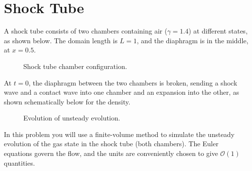 \pagebreak
\section{Shock Tube}
A shock tube consists of two chambers containing air ($\gamma = 1.4$) at different states, as shown below. The domain length is $L= 1$, and the diaphragm is in the middle, at $x= 0.5$.

\begin{figure}[h]
    \centering
    
    \caption{Shock tube chamber configuration.}
\end{figure}

At $t= 0$, the diaphragm between the two chambers is broken, sending a shock wave and a contact wave into one chamber and an expansion into the other, as shown schematically below for the density.

\begin{figure}[h]
    \centering
    
    \caption{Evolution of unsteady evolution.}
\end{figure}

In this problem you will use a finite-volume method to simulate the unsteady evolution of the gas state in the shock tube (both chambers). The Euler equations govern the flow, and the units are conveniently chosen to give $\mathcal{O}(1)$ quantities.

